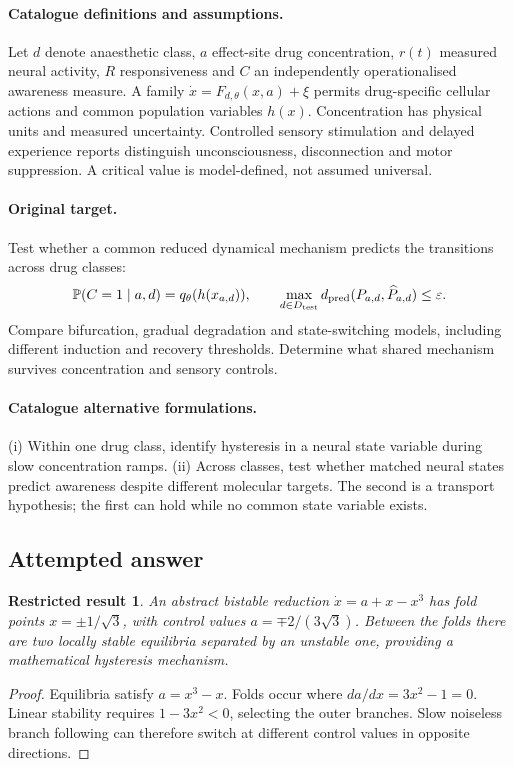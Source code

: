 \documentclass[11pt]{article}
\newcommand{\Prob}{\mathbb P}
\providecommand{\Prob}{\mathbb P}
\newtheorem{attemptresult}{Restricted result}[section]
\begin{document}
\paragraph{Catalogue definitions and assumptions.}
Let $d$ denote anaesthetic class, $a$ effect-site drug concentration, $r(t)$ measured neural activity, $R$ responsiveness and $C$ an independently operationalised awareness measure. A family $\dot x=F_{d,\theta}(x,a)+\xi$ permits drug-specific cellular actions and common population variables $h(x)$. Concentration has physical units and measured uncertainty. Controlled sensory stimulation and delayed experience reports distinguish unconsciousness, disconnection and motor suppression. A critical value is model-defined, not assumed universal.
\paragraph{Original target.}
Test whether a common reduced dynamical mechanism predicts the transitions across drug classes:
\[
\Prob(C=1\mid a,d)=q_\theta(h(x_{a,d})),
\qquad
\max_{d\in D_{\rm test}}d_{\rm pred}(P_{a,d},\widehat P_{a,d})\leq\varepsilon.
\]
Compare bifurcation, gradual degradation and state-switching models, including different induction and recovery thresholds. Determine what shared mechanism survives concentration and sensory controls.
\paragraph{Catalogue alternative formulations.}
(i) Within one drug class, identify hysteresis in a neural state variable during slow concentration ramps. (ii) Across classes, test whether matched neural states predict awareness despite different molecular targets. The second is a transport hypothesis; the first can hold while no common state variable exists.
\subsection{Attempted answer}
\begin{attemptresult}
An abstract bistable reduction $\dot x=a+x-x^3$ has fold points $x=\pm1/\sqrt3$, with control values $a=\mp2/(3\sqrt3)$. Between the folds there are two locally stable equilibria separated by an unstable one, providing a mathematical hysteresis mechanism.
\end{attemptresult}
\begin{proof}
Equilibria satisfy $a=x^3-x$. Folds occur where $da/dx=3x^2-1=0$. Linear stability requires $1-3x^2<0$, selecting the outer branches. Slow noiseless branch following can therefore switch at different control values in opposite directions.
\end{proof}
\end{document}
